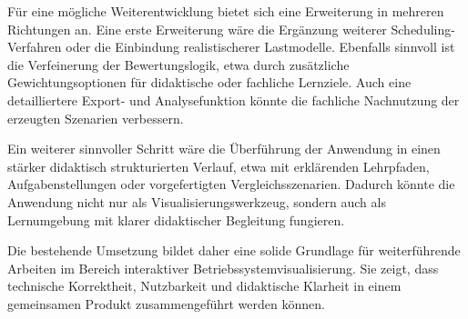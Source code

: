 Für eine mögliche Weiterentwicklung bietet sich eine Erweiterung in mehreren Richtungen an. Eine erste Erweiterung wäre die Ergänzung weiterer Scheduling-Verfahren oder die Einbindung realistischerer Lastmodelle. Ebenfalls sinnvoll ist die Verfeinerung der Bewertungslogik, etwa durch zusätzliche Gewichtungsoptionen für didaktische oder fachliche Lernziele. Auch eine detailliertere Export- und Analysefunktion könnte die fachliche Nachnutzung der erzeugten Szenarien verbessern.

Ein weiterer sinnvoller Schritt wäre die Überführung der Anwendung in einen stärker didaktisch strukturierten Verlauf, etwa mit erklärenden Lehrpfaden, Aufgabenstellungen oder vorgefertigten Vergleichsszenarien. Dadurch könnte die Anwendung nicht nur als Visualisierungswerkzeug, sondern auch als Lernumgebung mit klarer didaktischer Begleitung fungieren.

Die bestehende Umsetzung bildet daher eine solide Grundlage für weiterführende Arbeiten im Bereich interaktiver Betriebssystemvisualisierung. Sie zeigt, dass technische Korrektheit, Nutzbarkeit und didaktische Klarheit in einem gemeinsamen Produkt zusammengeführt werden können.
